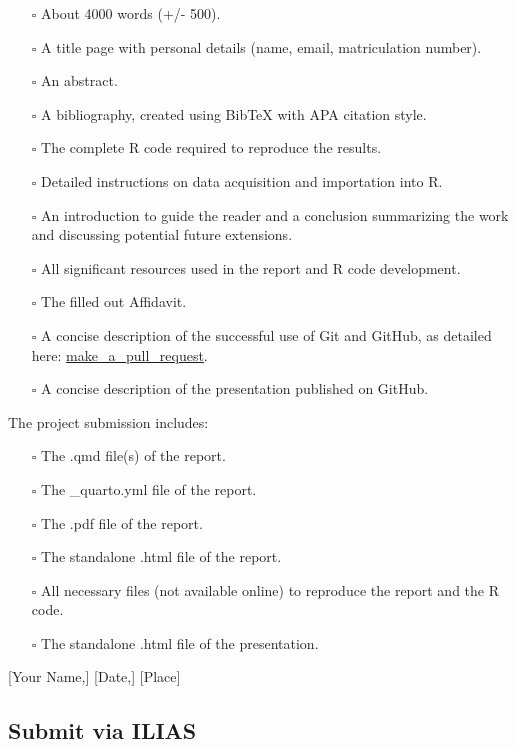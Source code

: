 \documentclass[
  a4paper,
  onecolumn,
  oneside]{scrartcl}
\providecommand{\tightlist}{%
  \setlength{\itemsep}{0pt}\setlength{\parskip}{0pt}}\usepackage{longtable,booktabs,array}
\begin{document}
\begin{tcolorbox}[enhanced jigsaw, toprule=.15mm, breakable, opacityback=0, arc=.35mm, left=2mm, leftrule=.75mm, colback=white, colframe=quarto-callout-tip-color-frame, rightrule=.15mm, bottomrule=.15mm]
\begin{itemize}
\tightlist
\item[$\square$]
  About 4000 words (+/- 500).
\item[$\square$]
  A title page with personal details (name, email, matriculation
  number).
\item[$\square$]
  An abstract.
\item[$\square$]
  A bibliography, created using BibTeX with APA citation style.
\item[$\square$]
  The complete R code required to reproduce the results.
\item[$\square$]
  Detailed instructions on data acquisition and importation into R.
\item[$\square$]
  An introduction to guide the reader and a conclusion summarizing the
  work and discussing potential future extensions.
\item[$\square$]
  All significant resources used in the report and R code development.
\item[$\square$]
  The filled out Affidavit.
\item[$\square$]
  A concise description of the successful use of Git and GitHub, as
  detailed here:
  \href{https://github.com/hubchev/make_a_pull_request}{make\_a\_pull\_request}.
\item[$\square$]
  A concise description of the presentation published on GitHub.
\end{itemize}

The project submission includes:

\begin{itemize}
\tightlist
\item[$\square$]
  The .qmd file(s) of the report.
\item[$\square$]
  The \_quarto.yml file of the report.
\item[$\square$]
  The .pdf file of the report.
\item[$\square$]
  The standalone .html file of the report.
\item[$\square$]
  All necessary files (not available online) to reproduce the report and
  the R code.
\item[$\square$]
  The standalone .html file of the presentation.
\end{itemize}

{[}Your Name,{]} {[}Date,{]} {[}Place{]}

\end{tcolorbox}

\subsection{Submit via ILIAS}\label{submit-via-ilias}
\end{document}

